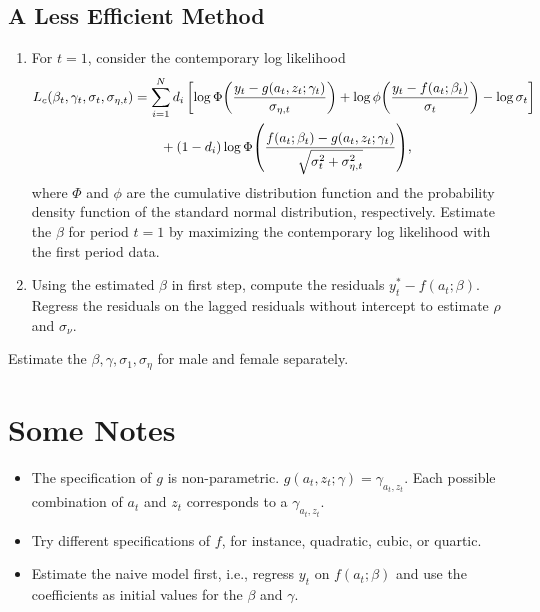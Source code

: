 \documentclass[a4paper, 12pt]{article}
\begin{document}
\subsection{A Less Efficient Method}
\begin{enumerate}
    \item For $t = 1$, consider the contemporary log likelihood 
    \begin{equation*}
        \begin{split}
            L_c(\beta_t,\gamma_t,\sigma_t,\sigma_{\eta,t}) &= \sum_{i=1}^N d_i\sbrc{\log\Phi\pth{\frac{y_t - g(a_t,z_t;\gamma_t)}{\sigma_{\eta,t}}} + \log\phi\pth{\frac{y_t - f(a_t;\beta_t)}{\sigma_t}} - \log\sigma_t} \\
            &\qquad + (1 - d_i)\log\Phi\pth{\frac{f(a_t;\beta_t) - g(a_t,z_t;\gamma_t)}{\sqrt{\sigma_t^2 + \sigma_{\eta,t}^2}}},
        \end{split}
    \end{equation*}
    where $\Phi$ and $\phi$ are the cumulative distribution function and the probability 
    density function of the standard normal distribution, respectively. Estimate the 
    $\beta$ for period $t = 1$ by maximizing the contemporary log likelihood with the first 
    period data.  
    \item Using the estimated $\beta$ in first step, compute the residuals $y_t^* - f(a_t;\beta)$. 
    Regress the residuals on the lagged residuals without intercept to estimate $\rho$ and $\sigma_\nu$. 
\end{enumerate}
Estimate the $\beta,\gamma,\sigma_1,\sigma_\eta$ for male and female separately. 

\section{Some Notes}
\begin{itemize}
    \item The specification of $g$ is non-parametric. $g(a_t,z_t;\gamma) = \gamma_{a_t,z_t}$. Each possible 
    combination of $a_t$ and $z_t$ corresponds to a $\gamma_{a_t,z_t}$.
    \item Try different specifications of $f$, for instance, quadratic, cubic, or quartic. 
    \item Estimate the naive model first, i.e., regress $y_t$ on $f(a_t;\beta)$ and use 
    the coefficients as initial values for the $\beta$ and $\gamma$.
\end{itemize}

%
%
\end{document}
